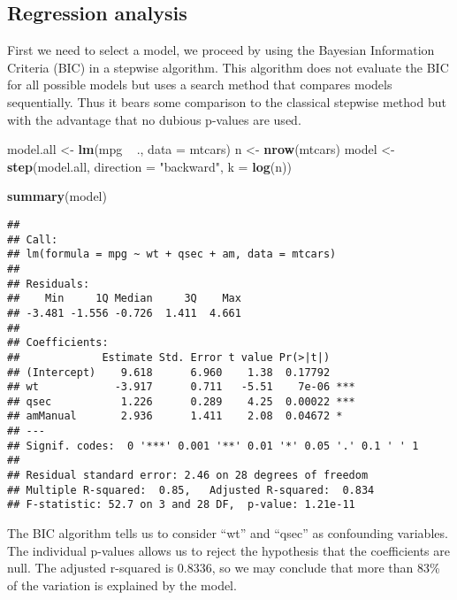 \documentclass[a3paper]{article}
\newenvironment{Shaded}{\begin{snugshade}}{\end{snugshade}}
\newcommand{\KeywordTok}[1]{\textcolor[rgb]{0.13,0.29,0.53}{\textbf{{#1}}}}
\newcommand{\DataTypeTok}[1]{\textcolor[rgb]{0.13,0.29,0.53}{{#1}}}
\newcommand{\StringTok}[1]{\textcolor[rgb]{0.31,0.60,0.02}{{#1}}}
\newcommand{\NormalTok}[1]{{#1}}
\begin{document}
\subsection{Regression analysis}\label{regression-analysis}

First we need to select a model, we proceed by using the Bayesian
Information Criteria (BIC) in a stepwise algorithm. This algorithm does
not evaluate the BIC for all possible models but uses a search method
that compares models sequentially. Thus it bears some comparison to the
classical stepwise method but with the advantage that no dubious
p-values are used.

\begin{Shaded}
\begin{Highlighting}[]
\NormalTok{model.all <-}\StringTok{ }\KeywordTok{lm}\NormalTok{(mpg ~}\StringTok{ }\NormalTok{., }\DataTypeTok{data =} \NormalTok{mtcars)}
\NormalTok{n <-}\StringTok{ }\KeywordTok{nrow}\NormalTok{(mtcars)}
\NormalTok{model <-}\StringTok{ }\KeywordTok{step}\NormalTok{(model.all, }\DataTypeTok{direction =} \StringTok{"backward"}\NormalTok{, }\DataTypeTok{k =} \KeywordTok{log}\NormalTok{(n))}
\end{Highlighting}
\end{Shaded}

\begin{Shaded}
\begin{Highlighting}[]
\KeywordTok{summary}\NormalTok{(model)}
\end{Highlighting}
\end{Shaded}

\begin{verbatim}
## 
## Call:
## lm(formula = mpg ~ wt + qsec + am, data = mtcars)
## 
## Residuals:
##    Min     1Q Median     3Q    Max 
## -3.481 -1.556 -0.726  1.411  4.661 
## 
## Coefficients:
##             Estimate Std. Error t value Pr(>|t|)    
## (Intercept)    9.618      6.960    1.38  0.17792    
## wt            -3.917      0.711   -5.51    7e-06 ***
## qsec           1.226      0.289    4.25  0.00022 ***
## amManual       2.936      1.411    2.08  0.04672 *  
## ---
## Signif. codes:  0 '***' 0.001 '**' 0.01 '*' 0.05 '.' 0.1 ' ' 1
## 
## Residual standard error: 2.46 on 28 degrees of freedom
## Multiple R-squared:  0.85,   Adjusted R-squared:  0.834 
## F-statistic: 52.7 on 3 and 28 DF,  p-value: 1.21e-11
\end{verbatim}

The BIC algorithm tells us to consider ``wt'' and ``qsec'' as
confounding variables. The individual p-values allows us to reject the
hypothesis that the coefficients are null. The adjusted r-squared is
0.8336, so we may conclude that more than 83\% of the variation is
explained by the model.
\end{document}
